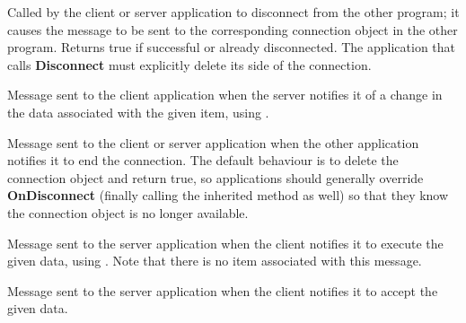 
Called by the client or server application to disconnect from the
other program; it causes the  
message to be sent to the corresponding connection object in the
other program. Returns true if successful or already disconnected.
The application that calls {\bf Disconnect} must explicitly delete
its side of the connection.

\label{wxddeconnectiononadvise}


Message sent to the client application when the server notifies
it of a change in the data associated with the given item, using
.

\label{wxddeconnectionondisconnect}


Message sent to the client or server application when the other
application notifies it to end the connection. The default
behaviour is to delete the connection object and return true, so
applications should generally override {\bf OnDisconnect}
(finally calling the inherited method as well) so that they know
the connection object is no longer available.

\label{wxddeconnectiononexecute}


Message sent to the server application when the client notifies
it to execute the given data, using .
Note that there is no item associated with this message.

\label{wxddeconnectiononpoke}


Message sent to the server application when the client notifies it to
accept the given data.

